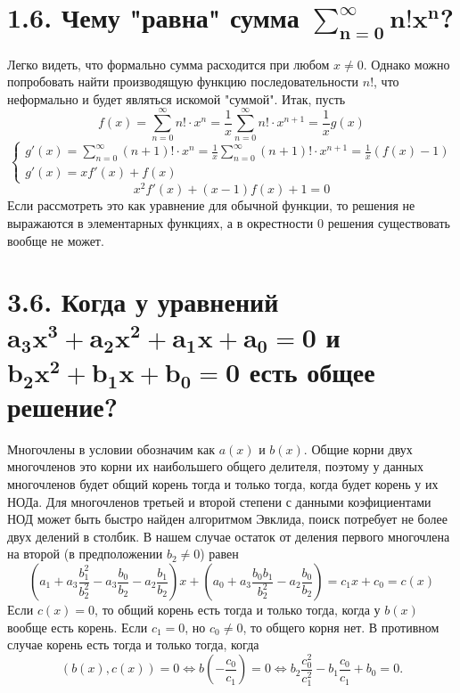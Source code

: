 \documentclass{article}
\begin{document}
\section*{1.6. Чему "равна" сумма $\bm{\sum_{n=0}^{\infty}n!x^n}$?}
    Легко видеть, что формально сумма расходится при любом $x\neq0$. Однако можно попробовать найти производящую функцию последовательности $n!$, что неформально и будет являться искомой "суммой". Итак, пусть
    $$f(x)=\sum_{n=0}^{\infty}n!\cdot x^n=\frac{1}{x}\sum_{n=0}^{\infty}n!\cdot x^{n+1}=\frac{1}{x}g(x)$$
    $$\begin{cases}
    g'(x)=\sum_{n=0}^{\infty}(n+1)!\cdot x^n=\frac{1}{x}\sum_{n=0}^{\infty}(n+1)!\cdot x^{n+1}=\frac{1}{x}(f(x)-1)\\
    g'(x)=x f'(x)+f(x)
    \end{cases}$$
    $$x^2 f'(x) + (x-1) f(x) + 1 = 0$$
    Если рассмотреть это как уравнение для обычной функции, то решения не выражаются в элементарных функциях, а в окрестности 0 решения существовать вообще не может. 

\section*{3.6. Когда у уравнений $\bm{a_3x^3 + a_2x^2 + a_1x + a_0 = 0}$ и $\bm{b_2x^2 + b_1x + b_0 = 0}$ есть общее решение?}
    Многочлены в условии обозначим как $a(x)$ и $b(x)$.
    Общие корни двух многочленов это корни их наибольшего общего делителя, поэтому у данных многочленов будет общий корень тогда и только тогда, когда будет корень у их НОДа. Для многочленов третьей и второй степени с данными коэфициентами НОД может быть быстро найден алгоритмом Эвклида, поиск потребует не более двух делений в столбик. В нашем случае остаток от деления первого многочлена на второй (в предположении $b_2\neq0$) равен 
    $$
    \left(a_1+a_3\frac{b_1^{2}}{b_2^{2}}-a_3\frac{b_0}{b_2}-a_2\frac{b_1}{b_2}\right) x + \left(a_0+a_3\frac{b_0 b_1}{b_2^{2}}-a_2\frac{b_0}{b_2}\right) = c_1 x + c_0 = c(x)
    $$
    Если $c(x) = 0$, то общий корень есть тогда и только тогда, когда у $b(x)$ вообще есть корень. Если $c_1 = 0$, но $c_0 \neq 0$, то общего корня нет. В противном случае корень есть тогда и только тогда, когда 
    $$(b(x), c(x))=0\Leftrightarrow b\left(-\frac{c_0}{c_1}\right)=0\Leftrightarrow b_2\frac{c_0^{2}}{c_1^{2}}-b_1\frac{c_0}{c_1}+b_0=0.$$
    
\end{document}
